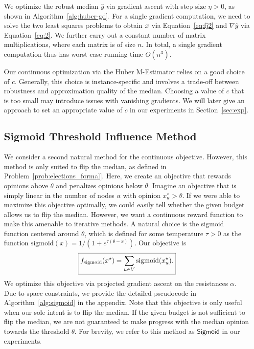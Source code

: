 We optimize the robust median $\hat y$
via gradient ascent with step size
$\eta > 0$, as shown in
Algorithm~\ref{alg:huber-gd}.
%
For a single gradient computation, we need to
solve the two least squares problems to obtain
$\bx$ via Equation~\eqref{eq:fj2} and
$\nabla \hat y$ via Equation~\ref{eq:2}.
We further carry out a constant number of
matrix multiplications, where each matrix
is of size $n$. In total, a single gradient
computation thus has worst-case running
time $O(n^3)$.

Our continuous optimization via the Huber
M-Estimator relies on a good choice of
$c$. Generally, this choice is instance-specific
and involves a trade-off between robustness
and approximation quality of the median.
Choosing a value of $c$
that is too small may introduce issues
with vanishing gradients.
We will later give an approach to set an
appropriate value of $c$ in our experiments
in Section~\ref{sec:exp}.

\iffalse
In contrast, each evaluation of the marginal gain
in greedy is just as expensive asymptotically
(as it also involves solving a linear system). However,
this can be sped up by computing $\bx$ via simulation
which can warm start using the equilibirum opinions
of the previous iteration. Overall, we compute
$O(B n)$ marginal gains where $B$ is the
number of stooges.
\fi


\subsection{Sigmoid Threshold Influence Method}
\label{sec:sigmoid}

We consider a second natural method
for the continuous objective.
However, this method is only suited
to flip the median, as defined in
Problem~\ref{prob:elections_formal}.
Here, we create an objective
that rewards opinions above $\theta$
and penalizes opinions below $\theta$.
Imagine an objective that is simply linear
in the number of nodes $u$ with opinion
$x^\star_u > \theta$.
If we were able to maximize this objective
optimally, we could easily tell whether
the given budget allows us to flip
the median. However, we want 
a continuous reward function to make this
amenable to iterative methods. A
natural choice is the sigmoid function centered
around $\theta$, which is defined
for some temperature $\tau > 0$
as the function
$\mathrm{sigmoid}(x) = 1 / (1 + e^{\tau (\theta-x)})$.
Our objective is
%
$$
\boxed{     f_{\mathrm{sigmoid}}(x^\star) =
        \sum_{u \in V} \mathrm{sigmoid} (x^\star_u) .}
$$
%
We optimize this objective via
projected gradient ascent on
the resistances $\alpha$. Due to space constraints, we provide the detailed pseudocode
in Algorithm~\ref{alg:sigmoid}
in the appendix.  Note that this objective is only
useful when our sole intent is to flip the
median. If the given budget is not
sufficient to flip the median, we are
not guaranteed to make progress with
the median opinion towards the
threshold $\theta$. For brevity, we refer to this method as $\textsf{Sigmoid}$ in our experiments. 






